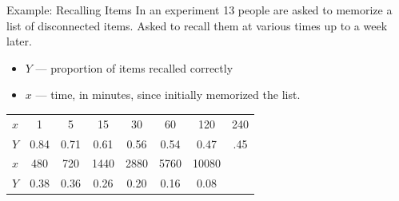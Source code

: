 \documentclass{beamer}
\begin{document}
\begin{frame}{Example: Recalling Items}
In an experiment 13 people are asked to memorize a list of
disconnected items. Asked to recall them at various times up to a week later.\pause
\begin{itemize}
    \item $Y$ --- proportion of items recalled correctly
    \item $x$ --- time, in minutes, since initially memorized the list.
\end{itemize}
\pause\begin{table}
    \centering
    \begin{tabular}{c c c c c c c c}
        \toprule
        $x$ & 1 & 5 & 15 & 30 & 60 & 120 & 240 \\
        $Y$ & 0.84 & 0.71 & 0.61 & 0.56 & 0.54 & 0.47 & .45\\
        \midrule
        $x$ & 480 & 720 & 1440 & 2880 & 5760 & 10080 \\
        $Y$ & 0.38 & 0.36 & 0.26 & 0.20 & 0.16 & 0.08\\
        \bottomrule
    \end{tabular}
\end{table}
\end{frame}
\end{document}

